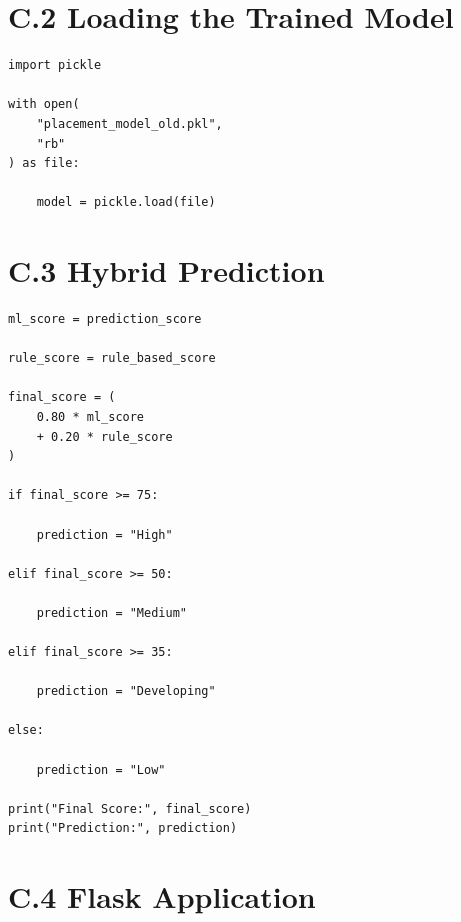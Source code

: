 \documentclass[12pt,a4paper]{report}
\begin{document}
\vspace{0.3cm}

\section*{C.2 Loading the Trained Model}

\begin{lstlisting}[caption={Loading the Trained Model}]
import pickle

with open(
    "placement_model_old.pkl",
    "rb"
) as file:

    model = pickle.load(file)
\end{lstlisting}

\clearpage

\section*{C.3 Hybrid Prediction}

\begin{lstlisting}[caption={Hybrid Prediction Logic}]
ml_score = prediction_score

rule_score = rule_based_score

final_score = (
    0.80 * ml_score
    + 0.20 * rule_score
)

if final_score >= 75:

    prediction = "High"

elif final_score >= 50:

    prediction = "Medium"

elif final_score >= 35:

    prediction = "Developing"

else:

    prediction = "Low"

print("Final Score:", final_score)
print("Prediction:", prediction)
\end{lstlisting}

\vspace{0.3cm}

\section*{C.4 Flask Application}
\end{document}
